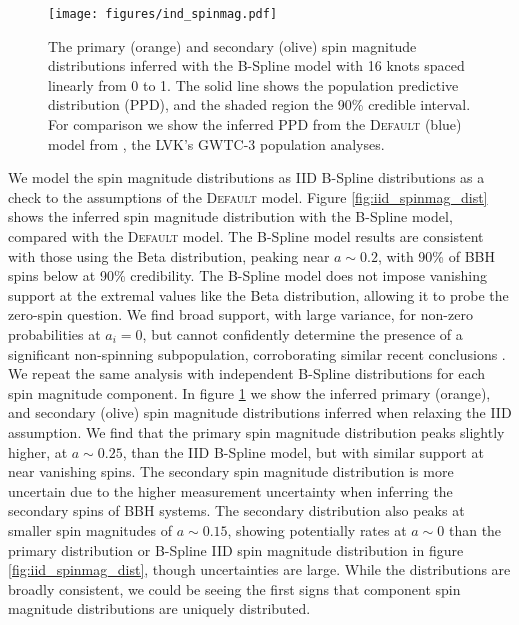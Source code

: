 \begin{figure} 
    \begin{centering}
        \texttt{[image: figures/ind\_spinmag.pdf]}
        \caption{The primary (orange) and secondary (olive) spin magnitude distributions inferred with the B-Spline model
        with 16 knots spaced linearly from 0 to 1. The solid line shows the population predictive distribution (PPD), and the shaded region the 90\% credible interval. 
        For comparison we show the inferred PPD from the \textsc{Default} (blue) model from \citet{o3b_astro_dist}, the LVK's GWTC-3 population analyses.}
        \label{fig:ind_spinmag_dist}
    \end{centering}
\end{figure}

We model the spin magnitude distributions as IID B-Spline distributions as a check to the assumptions of the \textsc{Default} model. 
Figure \ref{fig:iid_spinmag_dist} shows the inferred spin magnitude distribution with the B-Spline model, compared with the \textsc{Default} model. 
The B-Spline model results are consistent with those using the Beta distribution, peaking near $a\sim0.2$, with 90\% of BBH spins below 
\result{$\CIPlusMinus{\macros[BSplineIIDCompSpins][a_90percentile]}$} at 90\% credibility. The B-Spline model does not impose vanishing support at the extremal values like the Beta distribution, 
allowing it to probe the zero-spin question. We find broad support, with large variance, for non-zero probabilities at $a_i=0$, but cannot confidently determine the presence of 
a significant non-spinning subpopulation, corroborating similar recent conclusions \citep{BuildBetterSpinModels,Callister_NoEvidence,GWTC3MonashSpin}. 
We repeat the same analysis with independent B-Spline distributions for each spin magnitude component. In figure \ref{fig:ind_spinmag_dist} 
we show the inferred primary (orange), and secondary (olive) spin magnitude distributions inferred when relaxing the IID assumption. We find that the primary spin magnitude distribution 
peaks slightly higher, at $a\sim0.25$, than the IID B-Spline model, but with similar support at near vanishing spins. The secondary spin magnitude distribution is more uncertain due to the 
higher measurement uncertainty when inferring the secondary spins of BBH systems. The secondary distribution also peaks at smaller spin magnitudes of $a\sim0.15$, showing potentially rates at $a\sim0$ than the primary distribution or B-Spline IID spin magnitude distribution in figure \ref{fig:iid_spinmag_dist}, though uncertainties are large. While the distributions are broadly consistent, we could be seeing the first signs that component spin magnitude distributions are uniquely distributed. 

